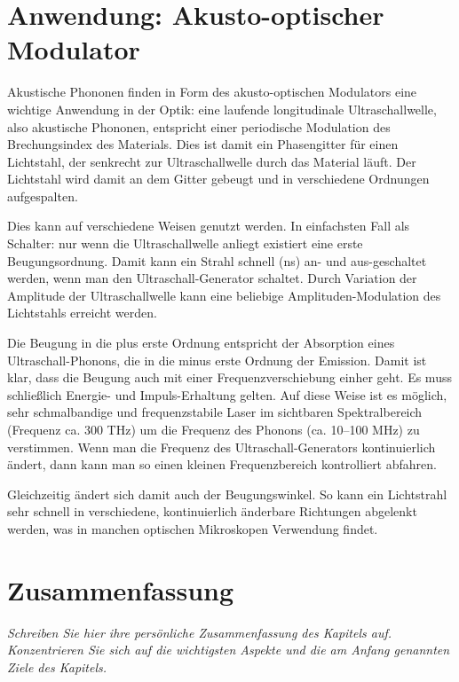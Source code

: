 \section{Anwendung: Akusto-optischer Modulator}

Akustische Phononen finden in Form des  akusto-optischen Modulators eine wichtige Anwendung in der Optik: eine laufende longitudinale Ultraschallwelle, also akustische Phononen, entspricht einer periodische Modulation des Brechungsindex des Materials. Dies ist damit ein Phasengitter für einen Lichtstahl, der senkrecht zur Ultraschallwelle durch das Material läuft. Der Lichtstahl wird damit an dem Gitter gebeugt und in verschiedene Ordnungen aufgespalten.

Dies kann auf verschiedene Weisen genutzt werden. In einfachsten Fall als Schalter: nur wenn die Ultraschallwelle anliegt existiert eine erste Beugungsordnung. Damit kann ein Strahl schnell (ns) an- und aus-geschaltet werden, wenn man den Ultraschall-Generator schaltet. Durch Variation der Amplitude der Ultraschallwelle kann eine beliebige Amplituden-Modulation des Lichtstahls erreicht werden.

Die Beugung in die plus erste Ordnung entspricht der Absorption eines Ultraschall-Phonons, die in die minus erste Ordnung der Emission. Damit ist klar, dass die Beugung auch mit einer Frequenzverschiebung einher geht. Es muss schließlich Energie- und Impuls-Erhaltung gelten. Auf diese Weise ist es möglich, sehr schmalbandige und frequenzstabile Laser im sichtbaren Spektralbereich (Frequenz ca. 300 THz) um die Frequenz des Phonons (ca. 10--100 MHz) zu verstimmen. Wenn man die Frequenz des  Ultraschall-Generators kontinuierlich ändert, dann kann man so einen kleinen Frequenzbereich kontrolliert abfahren.

Gleichzeitig ändert sich damit auch der Beugungswinkel. So kann ein Lichtstrahl sehr schnell in verschiedene, kontinuierlich änderbare Richtungen abgelenkt werden, was in manchen optischen Mikroskopen Verwendung findet.


\section{Zusammenfassung}

\textit{Schreiben Sie hier ihre persönliche Zusammenfassung des Kapitels auf. Konzentrieren Sie sich auf die wichtigsten Aspekte und die am Anfang genannten Ziele des Kapitels.}

\vspace*{10cm}





\printbibliography[segment=\therefsegment,heading=subbibliography]
